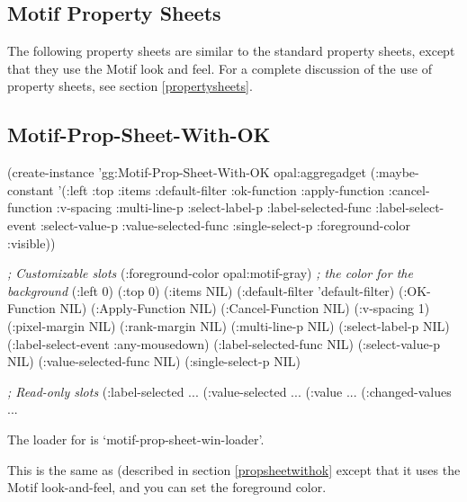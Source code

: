 \begin{group}
\section{Motif Property Sheets}
\label{motif-prop-sheets}

The following property sheets are similar to the standard property sheets,
except that they use the Motif look and feel.  For a complete discussion of
the use of property sheets, see section \ref{propertysheets}.


\subsection{Motif-Prop-Sheet-With-OK}

\begin{programexample}
(create-instance 'gg:Motif-Prop-Sheet-With-OK opal:aggregadget
    (:maybe-constant '(:left :top :items :default-filter :ok-function :apply-function
                       :cancel-function :v-spacing :multi-line-p :select-label-p
		       :label-selected-func :label-select-event :select-value-p
                       :value-selected-func :single-select-p :foreground-color :visible))

   {\it ; Customizable slots}
    (:foreground-color opal:motif-gray) {\it ; the color for the background}
    (:left 0) (:top 0)
    (:items NIL)
    (:default-filter 'default-filter)
    (:OK-Function NIL)
    (:Apply-Function NIL)
    (:Cancel-Function NIL)
    (:v-spacing 1)
    (:pixel-margin NIL)
    (:rank-margin NIL)
    (:multi-line-p NIL)
    (:select-label-p NIL)
    (:label-select-event :any-mousedown)
    (:label-selected-func NIL)
    (:select-value-p NIL)
    (:value-selected-func NIL)
    (:single-select-p NIL)

   {\it ; Read-only slots}
    (:label-selected ...
    (:value-selected ...
    (:value ...
    (:changed-values ...
\end{programexample}

The loader for  is
`motif-prop-sheet-win-loader'.

This is the same as  (described in section
\ref{propsheetwithok} except that it uses the
Motif look-and-feel, and you can set the foreground color.
\end{group}


